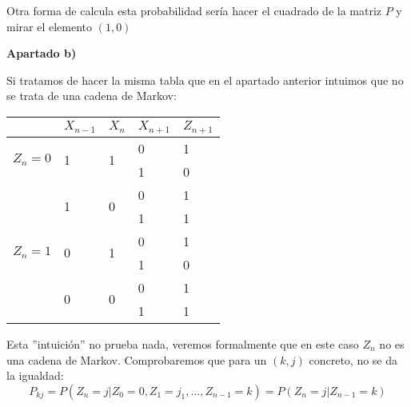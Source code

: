 \documentclass[openany]{book}
\begin{document}
\begin{exercise}
    Otra forma de calcula esta probabilidad sería hacer el cuadrado de la matriz $ P $ y mirar el elemento $ (1,0) $

    \begin{flushright}
        \textbf{Apartado b)}
    \end{flushright}
    
    Si tratamos de hacer la misma tabla que en el apartado anterior intuimos que no se trata de una cadena de Markov:


    \begin{tabular}{ll|l|l|l}
    \multicolumn{1}{l|}{}                          & $X_{n-1}$         & $X_n  $             & $X_{n+1}$ & $Z_{n+1}$ \\ \hline
    \multicolumn{1}{c|}{\multirow{2}{*}{$Z_n = 0$}} & \multirow{2}{*}{1} & \multirow{2}{*}{1} & 0          & 1          \\
    \multicolumn{1}{c|}{}                          &                    &                    & 1          & 0          \\ \hline
    \multicolumn{1}{l|}{\multirow{6}{*}{$Z_n = 1$}} & \multirow{2}{*}{1} & \multirow{2}{*}{0} & 0          & 1          \\
    \multicolumn{1}{l|}{}                          &                    &                    & 1          & 1          \\ \cline{2-5} 
    \multicolumn{1}{l|}{}                          & \multirow{2}{*}{0} & \multirow{2}{*}{1} & 0          & 1          \\
    \multicolumn{1}{l|}{}                          &                    &                    & 1          & 0          \\ \cline{2-5} 
    \multicolumn{1}{l|}{}                          & \multirow{2}{*}{0} & \multirow{2}{*}{0} & 0          & 1          \\
    \multicolumn{1}{l|}{}                          &                    &                    & 1          & 1         
    \end{tabular}



    Esta ''intuición'' no prueba nada, veremos formalmente que en este caso $ Z_n $ no es una cadena de Markov. Comprobaremos que para un $ (k,j)  $ concreto, no se da la igualdad:
    $$ P_{kj} = P(Z_n = j|Z_0 = 0,Z_1=j_1,...,Z_{n-1} = k) = P(Z_n=j|Z_{n-1} = k) $$


\end{exercise}
\end{document}
